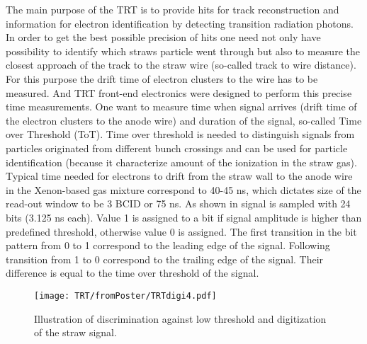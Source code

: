 The main purpose of the TRT is to provide hits for track reconstruction and information for electron identification by detecting transition radiation photons.
In order to get the best possible precision of hits one need not only have possibility to identify which straws particle went through 
but also to measure the closest approach of the track to the straw wire (so-called track to wire distance). For this purpose the drift time of electron clusters to the wire has to be measured.
And TRT front-end electronics were designed to perform this precise time measurements.
One want to measure time when signal arrives (drift time of the electron clusters to the anode wire) and duration of the signal, so-called Time over Threshold (ToT).
Time over threshold is needed to distinguish signals from particles originated from different bunch crossings 
and can be used for particle identification (because it characterize amount of the ionization in the straw gas).
Typical time needed for electrons to drift from the straw wall to the anode wire in the Xenon-based gas mixture correspond to 40-45 ns, which dictates size of the read-out window to be 
3 BCID or 75 ns. As shown in  signal is sampled with 24 bits (3.125 ns each). Value 1 is assigned to a bit if signal amplitude is higher than predefined threshold, 
otherwise value 0 is assigned. The first transition in the bit pattern from 0 to 1 correspond to the leading edge of the signal. Following transition from 1 to 0 
correspond to the trailing edge of the signal. Their difference is equal to the time over threshold of the signal. 

\begin{figure}
\begin{center}
 \texttt{[image: TRT/fromPoster/TRTdigi4.pdf]}
\caption{Illustration of discrimination against low threshold and digitization of the straw signal.}
\label{fig:pulseDigitization}
\end{center}
\end{figure}


